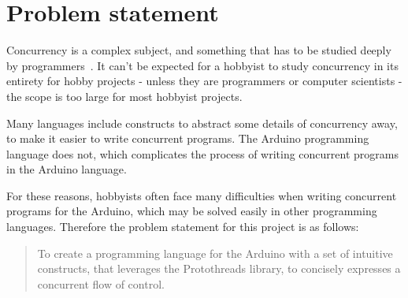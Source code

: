 \section{Problem statement}\label{sec:problemstatement}
Concurrency is a complex subject, and something that has to be studied deeply by programmers~\cite{Sebesta2016}. It can't be expected for a hobbyist to study concurrency in its entirety for hobby projects - unless they are programmers or computer scientists - the scope is too large for most hobbyist projects.

Many languages include constructs to abstract some details of concurrency away, to make it easier to write concurrent programs. The Arduino programming language does not, which complicates the process of writing concurrent programs in the Arduino language.

For these reasons, hobbyists often face many difficulties when writing concurrent programs for the Arduino, which may be solved easily in other programming languages. Therefore the problem statement for this project is as follows:

\blockquote{To create a programming language for the Arduino with a set of intuitive constructs, that leverages the Protothreads library, to concisely expresses a concurrent flow of control.}









